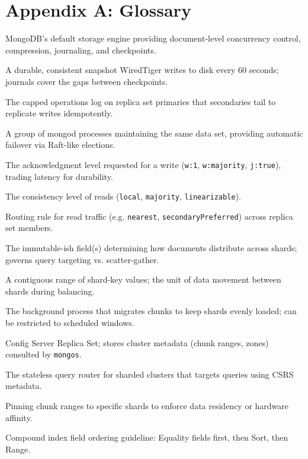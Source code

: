 \documentclass[11pt, a4paper]{article}
\begin{document}
\section{Appendix A: Glossary}
\begin{description}[leftmargin=4.5em, style=nextline, itemsep=0pt]
    \item[WiredTiger] MongoDB's default storage engine providing document-level concurrency control, compression, journaling, and checkpoints.
    \item[Checkpoint] A durable, consistent snapshot WiredTiger writes to disk every 60 seconds; journals cover the gaps between checkpoints.
    \item[Oplog] The capped operations log on replica set primaries that secondaries tail to replicate writes idempotently.
    \item[Replica Set] A group of mongod processes maintaining the same data set, providing automatic failover via Raft-like elections.
    \item[Write Concern] The acknowledgment level requested for a write (\texttt{w:1}, \texttt{w:majority}, \texttt{j:true}), trading latency for durability.
    \item[Read Concern] The consistency level of reads (\texttt{local}, \texttt{majority}, \texttt{linearizable}).
    \item[Read Preference] Routing rule for read traffic (e.g. \texttt{nearest}, \texttt{secondaryPreferred}) across replica set members.
    \item[Shard Key] The immutable-ish field(s) determining how documents distribute across shards; governs query targeting vs. scatter-gather.
    \item[Chunk] A contiguous range of shard-key values; the unit of data movement between shards during balancing.
    \item[Balancer] The background process that migrates chunks to keep shards evenly loaded; can be restricted to scheduled windows.
    \item[CSRS] Config Server Replica Set; stores cluster metadata (chunk ranges, zones) consulted by \texttt{mongos}.
    \item[mongos] The stateless query router for sharded clusters that targets queries using CSRS metadata.
    \item[Zone Sharding] Pinning chunk ranges to specific shards to enforce data residency or hardware affinity.
    \item[ESR Rule] Compound index field ordering guideline: Equality fields first, then Sort, then Range.

\end{description}
\end{document}
